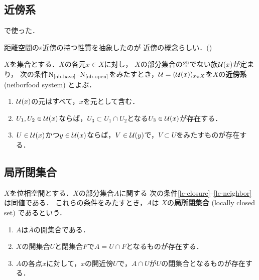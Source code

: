 \subsection{近傍系}

\cite[Prop.4.1.4]{KS90}で使った．

距離空間の\(\varepsilon\)近傍の持つ性質を抽象したのが
近傍の概念らしい．(\cite[p.41]{Mori81})
\begin{leftbar}
\begin{DFN}
    \(X\)を集合とする．\(X\)の各元\(x\in X\)に対し，
    \(X\)の部分集合の空でない族\(\mathcal{U}(x)\)が定まり，
    次の条件\(\mathrm{N}_\text{\ref{nb-have}}\)--\(\mathrm{N}_\text{\ref{nb-open}}\)をみたすとき，\(
        \mathcal{U}=(\mathcal{U}(x))_{x\in X}
    \)を\(X\)の\textbf{近傍系} (neiborfood system) とよぶ．
    \begin{enumerate}[\(\mathrm{N}_1\)]%
        \item \(\mathcal{U}(x)\)の元はすべて，\(x\)を元として含む．\label{nb-have}
        \item \(U_1, U_2\in\mathcal{U}(x)\)ならば，\(U_3\subset U_1\cap U_2\)となる\(U_3\in\mathcal{U}(x)\)が存在する．\label{nb-flt}
        \item \(U\in\mathcal{U}(x)\)かつ\(y\in\mathcal{U}(x)\)ならば，\(V\in\mathcal{U}(y)\)で，\(V\subset U\)をみたすものが存在する．\label{nb-open}
    \end{enumerate}
\end{DFN}
\end{leftbar}



\subsection{局所閉集合}




\begin{leftbar}
\begin{DFN}
    \(X\)を位相空間とする．\(X\)の部分集合\(A\)に関する
    次の条件\eqref{lc-closure}--\eqref{lc-neighbor}は同値である．
    これらの条件をみたすとき，\(A\)は
    \(X\)の\textbf{局所閉集合} (locally closed set) であるという．
    \begin{enumerate}[(1)]
        \item \(A\)は\(\bar{A}\)の開集合である．\label{lc-closure}
        \item \(X\)の開集合\(U\)と閉集合\(F\)で\(A=U\cap F\)となるものが存在する．\label{lc-intersection}
        \item \(A\)の各点\(x\)に対して，\(x\)の開近傍\(U\)で，\(A\cap U\)が\(U\)の閉集合となるものが存在する．\label{lc-neighbor}
    \end{enumerate}
\end{DFN}
\end{leftbar}

